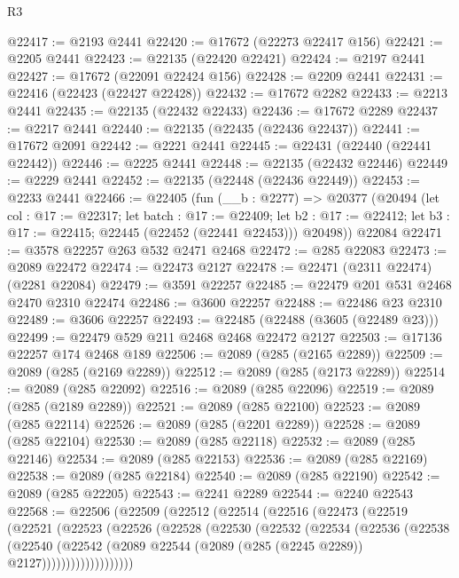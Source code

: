 \begin{lexlean}{R3}
\begin{coremodule}
@22417 := @2193 @2441
@22420 := @17672 (@22273 @22417 @156)
@22421 := @2205 @2441
@22423 := @22135 (@22420 @22421)
@22424 := @2197 @2441
@22427 := @17672 (@22091 @22424 @156)
@22428 := @2209 @2441
@22431 := @22416 (@22423 (@22427 @22428))
@22432 := @17672 @2282
@22433 := @2213 @2441
@22435 := @22135 (@22432 @22433)
@22436 := @17672 @2289
@22437 := @2217 @2441
@22440 := @22135 (@22435 (@22436 @22437))
@22441 := @17672 @2091
@22442 := @2221 @2441
@22445 := @22431 (@22440 (@22441 @22442))
@22446 := @2225 @2441
@22448 := @22135 (@22432 @22446)
@22449 := @2229 @2441
@22452 := @22135 (@22448 (@22436 @22449))
@22453 := @2233 @2441
@22466 := @22405
    (fun (__b : @2277) =>
    @20377
      (@20494
        (let col : @17 := @22317;
        let batch : @17 := @22409;
        let b2 : @17 := @22412; let b3 : @17 := @22415; @22445 (@22452 (@22441 @22453)))
        @20498))
    @22084
@22471 := @3578 @22257 @263 @532 @2471 @2468
@22472 := @285 @22083
@22473 := @2089 @22472
@22474 := @22473 @2127
@22478 := @22471 (@2311 @22474) (@2281 @22084)
@22479 := @3591 @22257
@22485 := @22479 @201 @531 @2468 @2470 @2310 @22474
@22486 := @3600 @22257
@22488 := @22486 @23 @2310
@22489 := @3606 @22257
@22493 := @22485 (@22488 (@3605 (@22489 @23)))
@22499 := @22479 @529 @211 @2468 @2468 @22472 @2127
@22503 := @17136 @22257 @174 @2468 @189
@22506 := @2089 (@285 (@2165 @2289))
@22509 := @2089 (@285 (@2169 @2289))
@22512 := @2089 (@285 (@2173 @2289))
@22514 := @2089 (@285 @22092)
@22516 := @2089 (@285 @22096)
@22519 := @2089 (@285 (@2189 @2289))
@22521 := @2089 (@285 @22100)
@22523 := @2089 (@285 @22114)
@22526 := @2089 (@285 (@2201 @2289))
@22528 := @2089 (@285 @22104)
@22530 := @2089 (@285 @22118)
@22532 := @2089 (@285 @22146)
@22534 := @2089 (@285 @22153)
@22536 := @2089 (@285 @22169)
@22538 := @2089 (@285 @22184)
@22540 := @2089 (@285 @22190)
@22542 := @2089 (@285 @22205)
@22543 := @2241 @2289
@22544 := @2240 @22543
@22568 := @22506
    (@22509
      (@22512
        (@22514
          (@22516
            (@22473
              (@22519
                (@22521
                  (@22523
                    (@22526
                      (@22528
                        (@22530
                          (@22532
                            (@22534
                              (@22536
                                (@22538
                                  (@22540
                                    (@22542
                                      (@2089
                                        @22544
                                        (@2089 (@285 (@2245 @2289)) @2127)))))))))))))))))))

\end{coremodule}
\end{lexlean}
